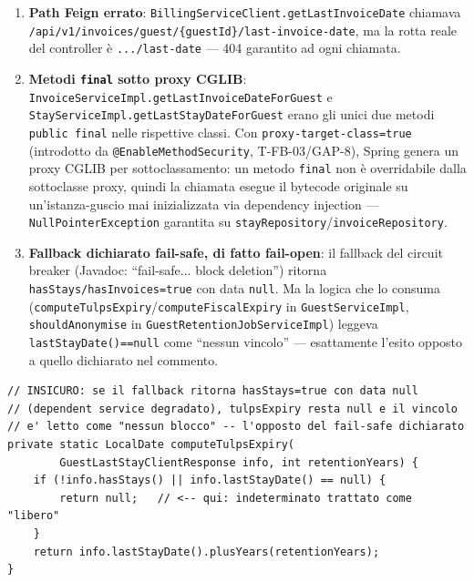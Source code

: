 ﻿\documentclass[a4paper,12pt]{report}
\begin{document}
\begin{enumerate}
  \item \textbf{Path Feign errato}: \texttt{BillingServiceClient.getLastInvoiceDate}
        chiamava \texttt{/api/v1/invoices/guest/\{guestId\}/last-invoice-date},
        ma la rotta reale del controller è \texttt{.../last-date} --- 404
        garantito ad ogni chiamata.
  \item \textbf{Metodi \texttt{final} sotto proxy CGLIB}: \texttt{InvoiceServiceImpl.getLastInvoiceDateForGuest}
        e \texttt{StayServiceImpl.getLastStayDateForGuest} erano gli unici
        due metodi \texttt{public final} nelle rispettive classi. Con
        \texttt{proxy-target-class=true} (introdotto da
        \texttt{@EnableMethodSecurity}, T-FB-03/GAP-8), Spring genera un
        proxy CGLIB per sottoclassamento: un metodo \texttt{final} non è
        overridabile dalla sottoclasse proxy, quindi la chiamata esegue il
        bytecode originale su un'istanza-guscio mai inizializzata via
        dependency injection --- \texttt{NullPointerException} garantita
        su \texttt{stayRepository}/\texttt{invoiceRepository}.
  \item \textbf{Fallback dichiarato fail-safe, di fatto fail-open}: il
        fallback del circuit breaker (Javadoc: ``fail-safe... block
        deletion'') ritorna \texttt{hasStays/hasInvoices=true} con data
        \texttt{null}. Ma la logica che lo consuma
        (\texttt{computeTulpsExpiry}/\texttt{computeFiscalExpiry} in
        \texttt{GuestServiceImpl}, \texttt{shouldAnonymise} in
        \texttt{GuestRetentionJobServiceImpl}) leggeva
        \texttt{lastStayDate()==null} come ``nessun vincolo'' --- esattamente
        l'esito opposto a quello dichiarato nel commento.
\end{enumerate}

\begin{insecurebox}[title={Codice Vulnerabile --- GuestServiceImpl.java (prima del fix)}]
\begin{lstlisting}[style=java]
// INSICURO: se il fallback ritorna hasStays=true con data null
// (dependent service degradato), tulpsExpiry resta null e il vincolo
// e' letto come "nessun blocco" -- l'opposto del fail-safe dichiarato
private static LocalDate computeTulpsExpiry(
        GuestLastStayClientResponse info, int retentionYears) {
    if (!info.hasStays() || info.lastStayDate() == null) {
        return null;   // <-- qui: indeterminato trattato come "libero"
    }
    return info.lastStayDate().plusYears(retentionYears);
}
\end{lstlisting}
\end{insecurebox}
\end{document}
